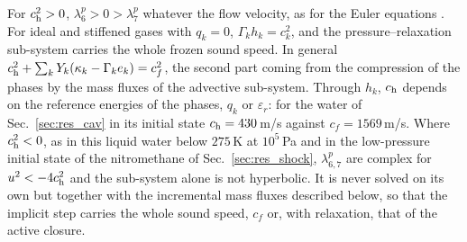 For $c_{\rm h}^2>0$, $\lambda^p_6>0>\lambda^p_7$ whatever the flow velocity, as for the Euler equations \cite{ToroVazquez2012}. For ideal and
stiffened gases with $q_k=0$, $\Gamma_kh_k=c_k^2$, and the pressure--relaxation sub-system carries the whole frozen sound speed. In
general $c_{\rm h}^2+\sum_kY_k(\kappa_k-\Gamma_ke_k)=c_f^2$, the second part coming from the compression of the phases by the mass fluxes
of the advective sub-system. Through $h_k$, $c_{\rm h}$ depends on the reference energies of the phases, $q_k$ or $\varepsilon_r$: for the water of
Sec.~\ref{sec:res_cav} in its initial state $c_{\rm h}=430$\,m/s against $c_f=1569$\,m/s. Where $c_{\rm h}^2<0$, as in this liquid water below $275$\,K
at $10^5$\,Pa and in the low-pressure initial state of the nitromethane of Sec.~\ref{sec:res_shock}, $\lambda^p_{6,7}$ are complex for $u^2<-4c_{\rm h}^2$
and the sub-system alone is not hyperbolic. It is never solved on its own but together with the incremental mass fluxes
described below, so that the implicit step carries the whole sound speed, $c_f$ or, with relaxation, that of the active
closure.


